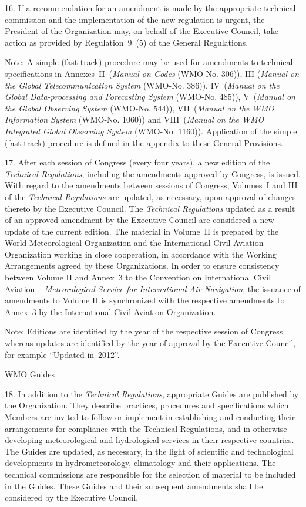 16. If a recommendation for an amendment is made by the appropriate technical commission and the implementation of the new regulation is urgent, the President of the Organization may, on behalf of the Executive Council, take action as provided by Regulation~9~(5) of the General Regulations.

Note: A simple (fast-track) procedure may be used for amendments to technical specifications in Annexes~II~(\emph{Manual on Codes} (WMO-No. 306)), III (\emph{Manual on the Global Telecommunication System} (WMO-No. 386)), IV~(\emph{Manual on the Global Data-processing and Forecasting System} (WMO-No. 485)), V~(\emph{Manual on the Global Observing System} (WMO-No. 544)), VII~(\emph{Manual on the WMO Information System} (WMO-No. 1060)) and VIII~(\emph{Manual on the WMO Integrated Global Observing System} (WMO-No. 1160)). Application of the simple (fast-track) procedure is defined in the appendix to these General Provisions.

17. After each session of Congress (every four years), a new edition of the \emph{Technical Regulations}, including the amendments approved by Congress, is issued. With regard to the amendments between sessions of Congress, Volumes~I and III of the \emph{Technical Regulations} are updated, as necessary, upon approval of changes thereto by the Executive Council. The \emph{Technical Regulations} updated as a result of an approved amendment by the Executive Council are considered a new update of the current edition. The material in Volume~II is prepared by the World Meteorological Organization and the International Civil Aviation Organization working in close cooperation, in accordance with the Working Arrangements agreed by these Organizations. In order to ensure consistency between Volume II and Annex~3 to the Convention on International Civil Aviation -- \emph{Meteorological Service for International Air Navigation}, the issuance of amendments to Volume II is synchronized with the respective amendments to Annex~3 by the International Civil Aviation Organization.

Note: Editions are identified by the year of the respective session of Congress whereas updates are identified by the year of approval by the Executive Council, for example ``Updated in~2012''.

WMO Guides

18. In addition to the \emph{Technical Regulations}, appropriate Guides are published by the Organization. They describe practices, procedures and specifications which Members are invited to follow or implement in establishing and conducting their arrangements for compliance with the Technical Regulations, and in otherwise developing meteorological and hydrological services in their respective countries. The Guides are updated, as necessary, in the light of scientific and technological developments in hydrometeorology, climatology and their applications. The technical commissions are responsible for the selection of material to be included in the Guides. These Guides and their subsequent amendments shall be considered by the Executive Council.

